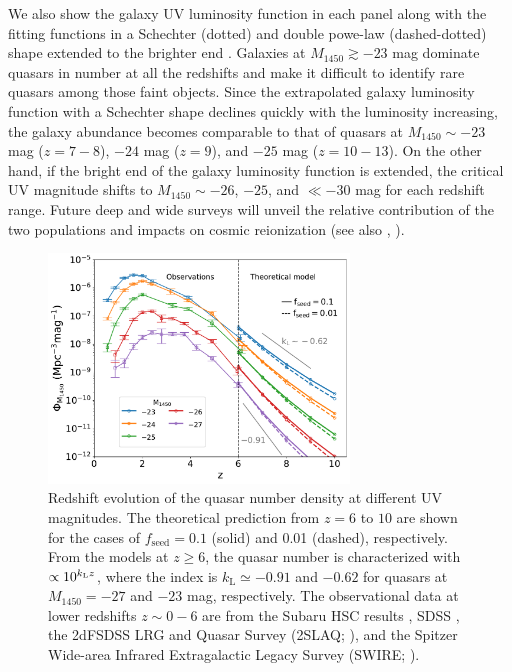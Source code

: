 \documentclass[twocolumn, twocolappendix]{aastex63}
\newcommand{\fseed}{f_\mathrm{seed}}
\newcommand{\Muv}{M_{1450}}
\begin{document}
\begin{CJK*}{UTF8}{gbsn}
We also show the galaxy UV luminosity function in each panel
along with the fitting functions in a Schechter (dotted) and double powe-law (dashed-dotted) shape extended to the brighter end
\citep{2013MNRAS.432.2696M, 2016ApJ...819..129O, 2018ApJ...867..150M, 2019ApJ...883...99S, 2020MNRAS.493.2059B,
2021AJ....162...47B, 2022arXiv220712356D,
2022ApJS..259...20H, Harikane_2022b, Harikane_2022c, 2022arXiv220709434N}.
Galaxies at $\Muv\gtrsim -23$ mag dominate quasars in number at all the redshifts and make it 
difficult to identify rare quasars among those faint objects.
Since the extrapolated galaxy luminosity function with a Schechter shape declines quickly with the luminosity increasing,
the galaxy abundance becomes comparable to that of quasars at $\Muv \sim -23$ mag ($z=7-8$), $-24$ mag ($z=9$), and $-25$ mag ($z=10-13$).
On the other hand, if the bright end of the galaxy luminosity function is extended, the critical UV magnitude shifts to
$\Muv\sim-26$, $-25$, and $\ll -30$ mag for each redshift range.
Future deep and wide surveys will unveil the relative contribution of the two populations and impacts on cosmic reionization
(see also , \citealt{2022NatAs...6..850J}).



\begin{figure}
\centering
\includegraphics[width=80mm]{QLFmag_z.pdf}
\caption{
Redshift evolution of the quasar number density at different UV magnitudes.
The theoretical prediction from $z=6$ to $10$ are shown for the cases of $\fseed=0.1$ (solid) and 0.01 (dashed), respectively.
From the models at $z\geq 6$, the quasar number is characterized with $\propto 10^{k_{\rm L}z}$,
where the index is $k_\mathrm{L} \simeq -0.91$ 
and $-0.62$ for quasars at $\Muv=-27$ and $-23$ mag, respectively.
The observational data at lower redshifts $z\sim 0-6$ are from the Subaru HSC results \citep{2018PASJ...70S..34A,2018ApJ...869..150M,2020ApJ...904...89N},
SDSS \citep{2006AJ....131.2766R,2013ApJ...768..105M},
the 2dFSDSS LRG and Quasar Survey (2SLAQ; \citealt{2009MNRAS.399.1755C}),
and the Spitzer Wide-area Infrared Extragalactic Legacy Survey (SWIRE; \citealt{2008ApJ...675...49S}).
}
\label{fig:QLFmag_z}
\vspace{5mm}
\end{figure}



\end{CJK*}
\end{document}
